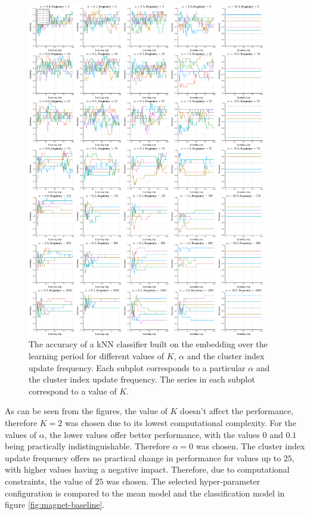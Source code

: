\begin{figure}[h]
  \centering
  \includegraphics[width=0.93\textwidth]{images/magnet-gridsearch/accuracy/K/magnet-gridsearch-accuracy-K.pdf}
  \caption{The accuracy of a kNN classifier built on the embedding over the learning period for different values of \( K \), \( \alpha \) and the cluster index update frequency. Each subplot corresponds to a particular \( \alpha \) and the cluster index update frequency. The series in each subplot correspond to a value of \( K \).}\label{fig:magnet-gridsearch-accuracy}
\end{figure}

As can be seen from the figures, the value of \( K \) doesn't affect the performance, therefore \( K = 2 \) was chosen due to its lowest computational complexity. For the values of \( \alpha \), the lower values offer better performance, with the values \( 0 \) and \( 0.1 \) being practically indistinguishable. Therefore \( \alpha = 0 \) was chosen. The cluster index update frequency offers no practical change in performance for values up to \( 25 \), with higher values having a negative impact. Therefore, due to computational constraints, the value of \( 25 \) was chosen. The selected hyper-parameter configuration is compared to the mean model and the classification model in figure \ref{fig:magnet-baseline}.

